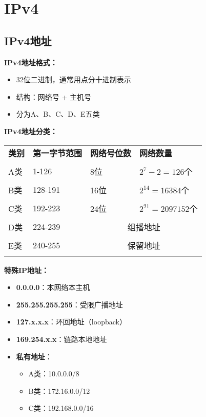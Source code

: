 \documentclass[lang=cn,newtx,10pt,scheme=chinese]{../../elegantbook}
\begin{document}
\section{IPv4}

\subsection{IPv4地址}

\textbf{IPv4地址格式：}
\begin{itemize}
  \item 32位二进制，通常用点分十进制表示
  \item 结构：网络号 + 主机号
  \item 分为A、B、C、D、E五类
\end{itemize}

\textbf{IPv4地址分类：}
\begin{longtable}{@{}p{1.5cm}p{4cm}p{3cm}p{4cm}@{}}
\toprule
\textbf{类别} & \textbf{第一字节范围} & \textbf{网络号位数} & \textbf{网络数量} \\\\ \midrule
\endhead

A类 & 1-126 & 8位 & $2^7-2=126$个 \\\\
B类 & 128-191 & 16位 & $2^{14}=16384$个 \\\\
C类 & 192-223 & 24位 & $2^{21}=2097152$个 \\\\
D类 & 224-239 & \multicolumn{2}{c}{组播地址} \\\\
E类 & 240-255 & \multicolumn{2}{c}{保留地址} \\\\

\bottomrule
\end{longtable}

\textbf{特殊IP地址：}
\begin{itemize}
  \item \textbf{0.0.0.0}：本网络本主机
  \item \textbf{255.255.255.255}：受限广播地址
  \item \textbf{127.x.x.x}：环回地址（loopback）
  \item \textbf{169.254.x.x}：链路本地地址
  \item \textbf{私有地址}：
    \begin{itemize}
      \item A类：10.0.0.0/8
      \item B类：172.16.0.0/12
      \item C类：192.168.0.0/16
    \end{itemize}
\end{itemize}
\end{document}

